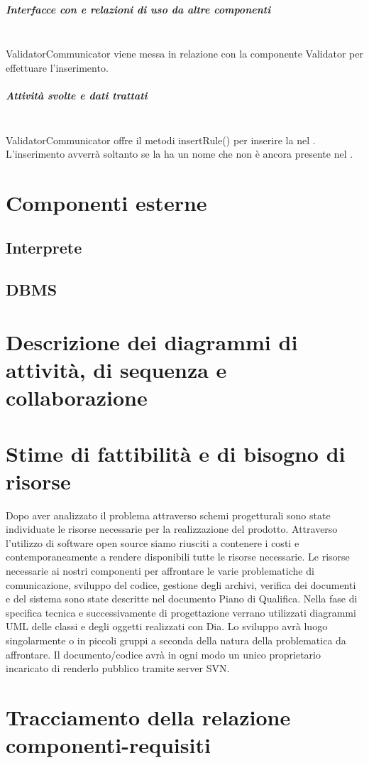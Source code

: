 \documentclass[11pt,titlepage,a4paper]{report}
\begin{document}
\paragraph{Interfacce con e relazioni di uso da altre componenti}\\
ValidatorCommunicator viene messa in relazione con la componente Validator per effettuare l'inserimento.
\paragraph{Attivit\`a svolte e dati trattati}\\
ValidatorCommunicator offre il metodi insertRule() per inserire la \br nel \re. L'inserimento avverr\`a soltanto se la \br ha un nome che non \`e ancora presente nel \re.

\chapter{Componenti esterne}
\section{Interprete}

\section{DBMS}

\chapter{Descrizione dei diagrammi di attivit\`a, di sequenza e collaborazione}%

\chapter{Stime di fattibilit\`a e di bisogno di risorse}
Dopo aver analizzato il problema attraverso schemi progetturali sono state individuate le risorse necessarie  per la realizzazione del prodotto. Attraverso l'utilizzo di software open source siamo riusciti a contenere i costi e contemporaneamente a rendere disponibili tutte le risorse necessarie.
Le risorse necessarie ai nostri componenti per affrontare le varie problematiche di comunicazione, sviluppo del codice, gestione degli archivi, verifica dei documenti e del sistema sono state descritte nel documento Piano di Qualifica. Nella fase di specifica tecnica e successivamente di progettazione verrano utilizzati diagrammi UML delle classi e degli oggetti realizzati con Dia. Lo sviluppo avr\`a luogo singolarmente o in piccoli gruppi a seconda della natura della problematica da affrontare. Il documento/codice avr\`a in ogni modo un unico proprietario incaricato di renderlo pubblico tramite server SVN.
\chapter{Tracciamento della relazione componenti-requisiti}
\end{document}
